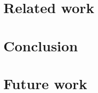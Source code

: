 \documentclass[USenglish]{uit-thesis}
\begin{document}
\chapter{Related work}


\chapter{Conclusion}


\chapter{Future work}


\printbibliography

% 

\backmatter
\end{document}
